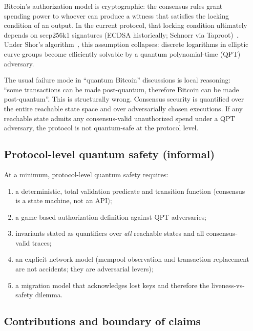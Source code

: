 \documentclass[11pt]{article}
\begin{document}
Bitcoin's authorization model is cryptographic: the consensus rules grant spending power to whoever can produce a witness that satisfies the locking condition of an output.
In the current protocol, that locking condition ultimately depends on secp256k1 signatures (ECDSA historically; Schnorr via Taproot)~\cite{fips186-5,bip340,bip341,bip342}.
Under Shor's algorithm~\cite{shor1994algorithms}, this assumption collapses: discrete logarithms in elliptic curve groups become efficiently solvable by a quantum polynomial-time (QPT) adversary.

The usual failure mode in ``quantum Bitcoin'' discussions is local reasoning: ``some transactions can be made post-quantum, therefore Bitcoin can be made post-quantum''.
This is structurally wrong.
Consensus security is quantified over the entire reachable state space and over adversarially chosen executions.
If any reachable state admits any consensus-valid unauthorized spend under a QPT adversary, the protocol is not quantum-safe at the protocol level.

\subsection{Protocol-level quantum safety (informal)}
At a minimum, protocol-level quantum safety requires:
\begin{enumerate}[leftmargin=2em]
  \item a deterministic, total validation predicate and transition function (consensus is a state machine, not an API);
  \item a game-based authorization definition against QPT adversaries;
  \item invariants stated as quantifiers over \emph{all} reachable states and all consensus-valid traces;
  \item an explicit network model (mempool observation and transaction replacement are not accidents; they are adversarial levers);
  \item a migration model that acknowledges lost keys and therefore the liveness-vs-safety dilemma.
\end{enumerate}

\subsection{Contributions and boundary of claims}\label{sec:contributions}
\end{document}
